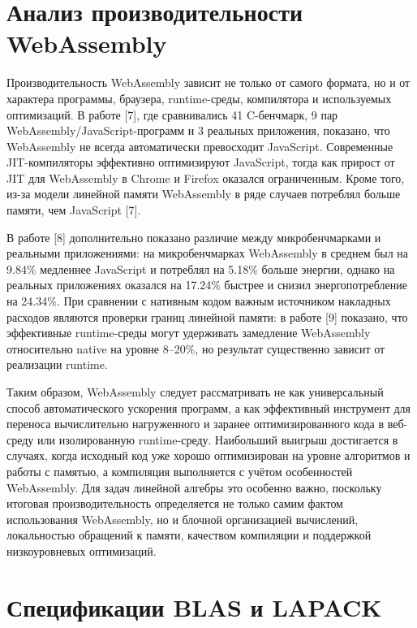 \documentclass[12pt, oneside]{book}
\begin{document}
\section{Анализ производительности WebAssembly}

    \quad Производительность WebAssembly зависит не только от самого формата, но и от характера программы, браузера, runtime-среды, компилятора и используемых оптимизаций. В работе [7], где сравнивались 41 C-бенчмарк, 9 пар WebAssembly/JavaScript-программ и 3 реальных приложения, показано, что WebAssembly не всегда автоматически превосходит JavaScript. Современные JIT-компиляторы эффективно оптимизируют JavaScript, тогда как прирост от JIT для WebAssembly в Chrome и Firefox оказался ограниченным. Кроме того, из-за модели линейной памяти WebAssembly в ряде случаев потреблял больше памяти, чем JavaScript [7].

    \quad В работе [8] дополнительно показано различие между микробенчмарками и реальными приложениями: на микробенчмарках WebAssembly в среднем был на 9.84\% медленнее JavaScript и потреблял на 5.18\% больше энергии, однако на реальных приложениях оказался на 17.24\% быстрее и снизил энергопотребление на 24.34\%. При сравнении с нативным кодом важным источником накладных расходов являются проверки границ линейной памяти: в работе [9] показано, что эффективные runtime-среды могут удерживать замедление WebAssembly относительно native на уровне 8--20\%, но результат существенно зависит от реализации runtime.

    \quad Таким образом, WebAssembly следует рассматривать не как универсальный способ автоматического ускорения программ, а как эффективный инструмент для переноса вычислительно нагруженного и заранее оптимизированного кода в веб-среду или изолированную runtime-среду. Наибольший выигрыш достигается в случаях, когда исходный код уже хорошо оптимизирован на уровне алгоритмов и работы с памятью, а компиляция выполняется с учётом особенностей WebAssembly. Для задач линейной алгебры это особенно важно, поскольку итоговая производительность определяется не только самим фактом использования WebAssembly, но и блочной организацией вычислений, локальностью обращений к памяти, качеством компиляции и поддержкой низкоуровневых оптимизаций.

\section{Спецификации BLAS и LAPACK}
\end{document}
